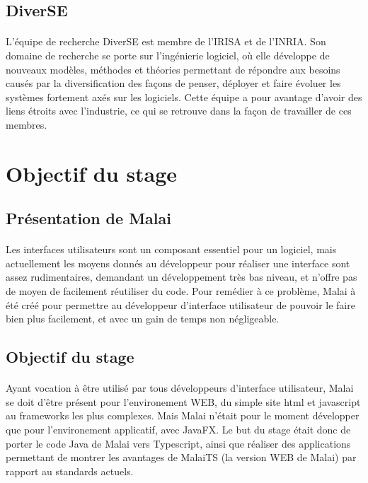 \documentclass[11pt, a4paper, pdftex]{article}
\begin{document}
    \subsection{DiverSE}\label{subsec:diverse}
             \paragraph{}
                L'équipe de recherche DiverSE est membre de l'IRISA et de l'INRIA. Son domaine de recherche se porte sur l'ingénierie logiciel, où elle développe de nouveaux modèles,
                méthodes et théories permettant de répondre aux besoins causés par la diversification des façons de penser, déployer et faire évoluer les systèmes fortement axés sur les logiciels.
                Cette équipe a pour avantage d'avoir des liens étroits avec l'industrie, ce qui se retrouve dans la façon de travailler de ces membres.
    \newpage
    \section{Objectif du stage}\label{sec:objsta}
    \vspace{1cm}
        \subsection{Présentation de Malai}\label{subsec:premal}
            \paragraph{}
                Les interfaces utilisateurs sont un composant essentiel pour un logiciel, mais actuellement les moyens donnés au développeur pour réaliser
                une interface sont assez rudimentaires, demandant un développement très bas niveau, et n'offre pas de moyen de facilement réutiliser du code.
                Pour remédier à ce problème, Malai à été créé pour permettre au développeur d'interface utilisateur de pouvoir le faire bien plus facilement, et avec un gain de temps non négligeable.
    \vspace{1cm}
        \subsection{Objectif du stage}\label{subsec:objsta}
            \paragraph{}
                Ayant vocation à être utilisé par tous développeurs d'interface utilisateur, Malai se doit d'être présent pour l'environement WEB, du simple site html et javascript au frameworks les plus complexes.
                Mais Malai n'était pour le moment développer que pour l'environement applicatif, avec JavaFX. Le but du stage était donc de porter le code Java de Malai
                vers Typescript, ainsi que réaliser des applications permettant de montrer les avantages de MalaiTS (la version WEB de Malai) par rapport au standards actuels.
\end{document}
